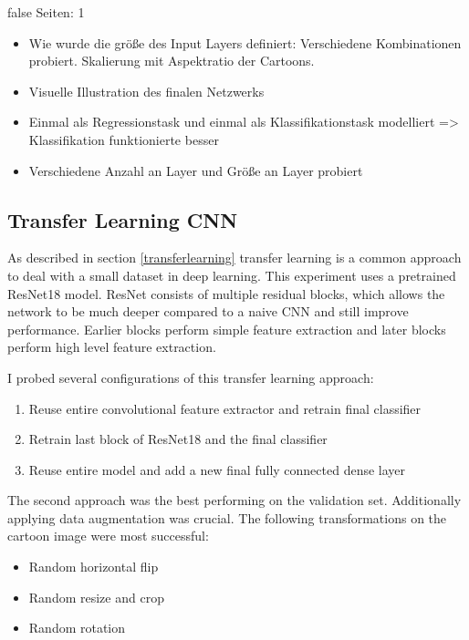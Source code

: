 \documentclass[draft,final,oneside]{vutinfth} %
\begin{document}

\if false
Seiten: 1

\begin{itemize}
\item Wie wurde die größe des Input Layers definiert: Verschiedene Kombinationen probiert. Skalierung mit Aspektratio der Cartoons. 
\item Visuelle Illustration des finalen Netzwerks
\item Einmal als Regressionstask und einmal als Klassifikationstask modelliert => Klassifikation funktionierte besser
\item Verschiedene Anzahl an Layer und Größe an Layer probiert
\end{itemize}

\fi

\subsection{Transfer Learning CNN}

As described in section \ref{transferlearning} transfer learning is a common approach to deal with a small dataset in deep learning. This experiment uses a pretrained ResNet18 model. \cite{resnet} ResNet consists of multiple residual blocks, which allows the network to be much deeper compared to a naive CNN and still improve performance. Earlier blocks perform simple feature extraction and later blocks perform high level feature extraction. 

I probed several configurations of this transfer learning approach:

\begin{enumerate}
\item Reuse entire convolutional feature extractor and retrain final classifier
\item Retrain last block of ResNet18 and the final classifier
\item Reuse entire model and add a new final fully connected dense layer
\end{enumerate}

The second approach was the best performing on the validation set. Additionally applying data augmentation was crucial. The following transformations on the cartoon image were most successful:

\begin{itemize}
\item Random horizontal flip
\item Random resize and crop
\item Random rotation
\end{itemize}
\end{document}

